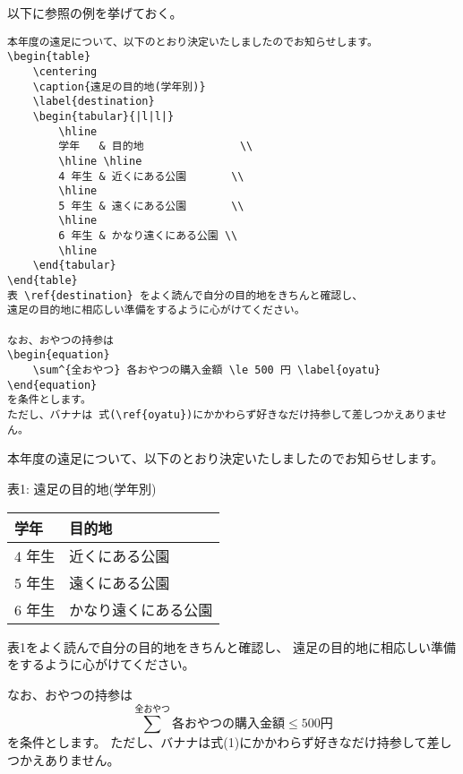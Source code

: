 以下に参照の例を挙げておく。
\begin{reidai}
    \begin{verbatim}
本年度の遠足について、以下のとおり決定いたしましたのでお知らせします。
\begin{table}
    \centering
    \caption{遠足の目的地(学年別)}
    \label{destination}
    \begin{tabular}{|l|l|}
        \hline
        学年   & 目的地               \\
        \hline \hline
        4 年生 & 近くにある公園       \\
        \hline
        5 年生 & 遠くにある公園       \\
        \hline
        6 年生 & かなり遠くにある公園 \\
        \hline
    \end{tabular}
\end{table}
表 \ref{destination} をよく読んで自分の目的地をきちんと確認し、
遠足の目的地に相応しい準備をするように心がけてください。

なお、おやつの持参は
\begin{equation}
    \sum^{全おやつ} 各おやつの購入金額 \le 500 円 \label{oyatu}
\end{equation}
を条件とします。
ただし、バナナは 式(\ref{oyatu})にかかわらず好きなだけ持参して差しつかえありません。
\end{verbatim}
\end{reidai}
\vspace*{-1.5em}
\begin{kekka}
    本年度の遠足について、以下のとおり決定いたしましたのでお知らせします。
    \begin{table}[H]
        \centering
        表1: 遠足の目的地(学年別) \\
        \begin{tabular}{|l|l|}
            \hline
            学年   & 目的地               \\
            \hline \hline
            4 年生 & 近くにある公園       \\
            \hline
            5 年生 & 遠くにある公園       \\
            \hline
            6 年生 & かなり遠くにある公園 \\
            \hline
        \end{tabular}
    \end{table}
    表1をよく読んで自分の目的地をきちんと確認し、
    遠足の目的地に相応しい準備をするように心がけてください。

    なお、おやつの持参は
    \begin{equation}
        \sum^{全おやつ} 各おやつの購入金額 \le 500 円
    \end{equation}
    を条件とします。
    ただし、バナナは式(1)にかかわらず好きなだけ持参して差しつかえありません。
\end{kekka}


